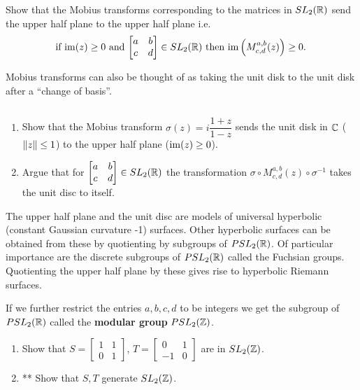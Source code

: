 \begin{question}
	Show that the Mobius transforms corresponding to the matrices in $SL_2(\mathbb{R})$ send the upper half plane to the upper half plane i.e.
	\begin{align*}
		\mbox{ if $\operatorname{im}(z) \ge 0$ and $\begin{bmatrix}a & b \\ c & d\end{bmatrix} \in SL_{2}(\mathbb{R})$ then $\operatorname{im}\left(M^{a,b}_{c,d}(z)\right) \ge 0$. }
	\end{align*}
\end{question}
Mobius transforms can also be thought of as taking the unit disk to the unit disk after a ``change of basis''.
\begin{question}$ $
	\begin{enumerate}
		\item Show that the Mobius transform $\sigma(z) = i\dfrac{1+z}{1-z}$ sends the unit disk in $\mathbb{C}$ ($\lVert z \rVert \le 1$) to the upper half plane ($\operatorname{im}(z) \ge 0$).
		\item Argue that for $\begin{bmatrix}a & b \\ c & d\end{bmatrix} \in SL_{2}(\mathbb{R})$ the transformation $\sigma \circ M^{a,b}_{c,d}(z) \circ \sigma^{-1}$ takes the unit disc to itself.
	\end{enumerate}
\end{question}

The upper half plane and the unit disc are models of universal hyperbolic (constant Gaussian curvature -1) surfaces. Other hyperbolic surfaces can be obtained from these by quotienting by subgroups of $PSL_2(\mathbb{R})$. Of particular importance are the discrete subgroups of $PSL_2(\mathbb{R})$ called the Fuchsian groups. Quotienting the upper half plane by these gives rise to hyperbolic Riemann surfaces.

\newpage

If we further restrict the entries $a, b, c, d$ to be integers we get the subgroup of $PSL_2(\mathbb{R})$ called the \textbf{modular group} $PSL_2(\mathbb{Z})$.

\begin{enumerate}
	\item Show that $S=\begin{bmatrix}1 & 1 \\ 0 & 1\end{bmatrix}$, $T=\begin{bmatrix}0 & 1 \\ -1 & 0\end{bmatrix}$ are in $SL_2(\mathbb{Z})$.
	\item** Show that $S, T$ generate $SL_2(\mathbb{Z})$.
\end{enumerate}

